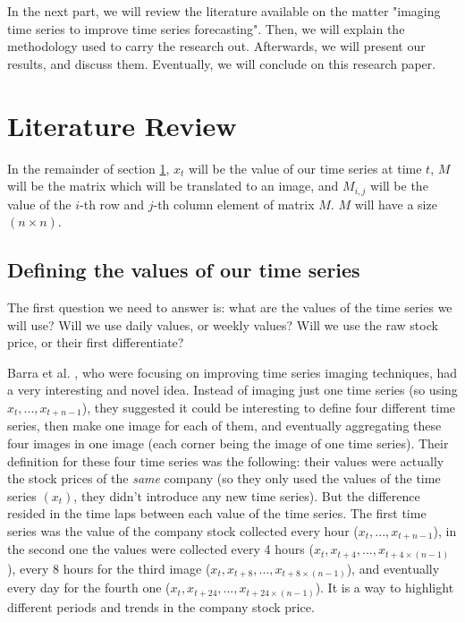 \documentclass[11pt]{article}
\begin{document}
\begin{onehalfspace}
In the next part, we will review the literature available on the matter "imaging time series to improve time series forecasting". Then, we will explain the methodology used to carry the research out. Afterwards, we will present our results, and discuss them. Eventually, we will conclude on this research paper.

\pagebreak

\section{Literature Review}

\label{sect_littrev}

In the remainder of section \ref{sect_littrev}, $x_t$ will be the value of our time series at time $t$, $M$ will be the matrix which will be translated to an image, and $M_{i,j}$ will be the value of the $i$-th row and $j$-th column element of matrix $M$. $M$ will have a size $(n \times n)$.

\subsection{Defining the values of our time series}

The first question we need to answer is: what are the values of the time series we will use? Will we use daily values, or weekly values? Will we use the raw stock price, or their first differentiate? 

Barra et al. \cite{barra}, who were focusing on improving time series imaging techniques, had a very interesting and novel idea. Instead of imaging just one time series (so using $x_t,...,x_{t+n-1}$), they suggested it could be interesting to define four different time series, then make one image for each of them, and eventually aggregating these four images in one image (each corner being the image of one time series). Their definition for these four time series was the following: their values were actually the stock prices of the \emph{same} company (so they only used the values of the time series $(x_t)$, they didn't introduce any new time series). But the difference resided in the time laps between each value of the time series. The first time series was the value of the company stock collected every hour ($x_t,...,x_{t+n-1}$), in the second one the values were collected every 4 hours ($x_t, x_{t + 4}, ...,x_{t+4 \times (n-1)}$), every 8 hours for the third image ($x_t, x_{t + 8}, ...,x_{t+8 \times (n-1)}$), and eventually every day for the fourth one ($x_t, x_{t + 24}, ...,x_{t+24 \times (n-1)}$). It is a way to highlight different periods and trends in the company stock price. 


\end{onehalfspace}
\end{document}
